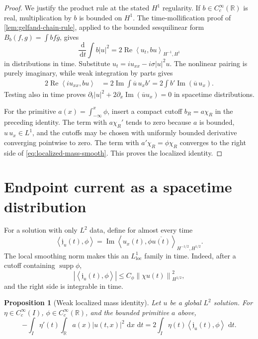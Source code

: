 \documentclass[11pt,oneside]{book}
\newtheorem{proposition}[theorem]{Proposition}
\theoremstyle{definition}
\theoremstyle{remark}
\newcommand{\R}{\mathbb R}
\newcommand{\supp}{\operatorname{supp}}
\newcommand{\1}{\mathbf 1}
\newcommand{\loc}{\mathrm{loc}}
\newcommand{\Rea}{\operatorname{Re}}
\newcommand{\Ima}{\operatorname{Im}}
\newcommand{\dd}{\,\mathrm d}
\newcommand{\norm}[1]{\left\lVert #1\right\rVert}
\newcommand{\pair}[2]{\left\langle #1,#2\right\rangle}
\begin{document}
\begin{proof}
We justify the product rule at the stated $H^1$ regularity.  If
$b\in C_c^\infty(\R)$ is real, multiplication by $b$ is bounded on $H^1$.
The time-mollification proof of \cref{lem:gelfand-chain-rule}, applied to the
bounded sesquilinear form
$B_b(f,g)=\int b f\overline g$, gives
\[
 \frac{\dd}{\dd t}\int b|u|^2
 =2\Rea\pair{u_t}{bu}_{H^{-1},H^1}
\]
in distributions in time.  Substitute
$u_t=i u_{xx}-i\sigma|u|^2u$.  The nonlinear pairing is purely imaginary,
while weak integration by parts gives
\begin{align*}
 2\Rea\pair{i u_{xx}}{bu}
 &=2\Ima\int \overline u\,u_x b'
 =2\int b'\Ima(\overline u\,u_x).
\end{align*}
Testing also in time proves
$\partial_t|u|^2+2\partial_x\Ima(\overline u u_x)=0$ in spacetime
distributions.

For the primitive $a(x)=\int_{-\infty}^x\phi$, insert a compact cutoff
$b_R=a\chi_R$ in the preceding identity.  The term with $a\chi_R'$ tends to
zero because $a$ is bounded, $u\,u_x\in L^1$, and the cutoffs may be chosen
with uniformly bounded derivative converging pointwise to zero.  The term
with $a'\chi_R=\phi\chi_R$ converges to the right side of
\eqref{eq:localized-mass-smooth}.  This proves the localized identity.
\end{proof}

\section{Endpoint current as a spacetime distribution}
For a solution with only $L^2$ data, define for almost every time
\begin{equation}
 \pair{\mathfrak j_u(t)}{\phi}
 =\Ima\pair{u_x(t)}{\phi\overline{u(t)}}_{H^{-1/2},H^{1/2}}. \label{eq:endpoint-current-def}
\end{equation}
The local smoothing norm makes this an $L^1_{\loc}$ family in time.
Indeed, after a cutoff containing $\supp\phi$,
\[
 |\pair{\mathfrak j_u(t)}{\phi}|
 \le C_\phi\norm{\chi u(t)}_{H^{1/2}}^2,
\]
and the right side is integrable in time.

\begin{proposition}[Weak localized mass identity]\label{prop:weak-localized-mass}
Let $u$ be a global $L^2$ solution.  For
$\eta\in C_c^\infty(I)$, $\phi\in C_c^\infty(\R)$, and the bounded primitive
$a$ above,
\begin{equation}
 -\int_I\eta'(t)\int_\R a(x)|u(t,x)|^2\,\dd x\,\dd t
 =2\int_I\eta(t)\pair{\mathfrak j_u(t)}{\phi}\,\dd t. \label{eq:weak-localized-mass}
\end{equation}
\end{proposition}
\end{document}
